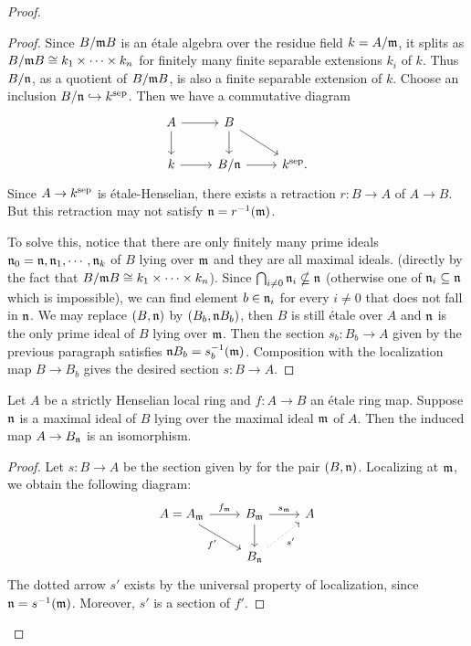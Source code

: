 \begin{proof}
\begin{proof}
  Since \(B/{\mathfrak{m}} B\) is an étale algebra over the residue field \(k = A/{\mathfrak{m}}\), it splits as \(B/{\mathfrak{m}} B \cong k_1 \times \cdots \times k_n\) for finitely many finite separable extensions \(k_i\) of \(k\). Thus \(B/{\mathfrak{n}}\), as a quotient of \(B/{\mathfrak{m}} B\), is also a finite separable extension of \(k\). Choose an inclusion \(B/{\mathfrak{n}} \hookrightarrow k^{\textnormal{sep}}\). Then we have a commutative diagram
  \[
  \begin{tikzcd}
    A \arrow{r} \arrow{d} & B \arrow{d}\arrow{rd} & \\
    k \arrow{r} & B/\n \arrow{r} & k^{\sep}.
  \end{tikzcd}
  \]
  Since \(A \to k^{\textnormal{sep}}\) is étale-Henselian, there exists a retraction \(r : B \to A\) of \(A \to B\). But this retraction may not satisfy \({\mathfrak{n}} = r^{-1}({\mathfrak{m}})\). 
  
  To solve this, notice that there are only finitely many prime ideals \({\mathfrak{n}}_0 = {\mathfrak{n}}, {\mathfrak{n}}_1, \cdots, {\mathfrak{n}}_k\) of \(B\) lying over \({\mathfrak{m}}\) and they are all maximal ideals. (directly by the fact that \(B/{\mathfrak{m}} B \cong k_1 \times \cdots \times k_n\)). Since \(\bigcap_{i \ne 0} {\mathfrak{n}}_i \nsubseteq {\mathfrak{n}}\) (otherwise one of \({\mathfrak{n}}_i \subseteq {\mathfrak{n}}\) which is impossible), we can find element \(b \in {\mathfrak{n}}_i\) for every \(i \ne 0\) that does not fall in ${\mathfrak{n}}$. We may replace \((B, {\mathfrak{n}})\) by \((B_b, {\mathfrak{n}} B_b)\), then \(B\) is still étale over \(A\) and \({\mathfrak{n}}\) is the only prime ideal of \(B\) lying over \({\mathfrak{m}}\). Then the section \(s_b : B_b \to A\) given by the previous paragraph satisfies \({\mathfrak{n}} B_b = s_b^{-1}({\mathfrak{m}})\). Composition with the localization map \(B \to B_b\) gives the desired section \(s : B \to A\).
\end{proof}

\begin{proposition}
    \label{thm:etale-over-strictly-henselian-localization-isom}
    Let \(A\) be a strictly Henselian local ring and \(f : A \to B\) an étale ring map. Suppose \({\mathfrak{n}}\) is a maximal ideal of \(B\) lying over the maximal ideal \({\mathfrak{m}}\) of \(A\). Then the induced map \(A \to B_{\mathfrak{n}}\) is an isomorphism.
\end{proposition}

\begin{proof}
  Let \(s: B \to A\) be the section given by  for the pair \((B, {\mathfrak{n}})\). Localizing at \({\mathfrak{m}}\), we obtain the following diagram:
  \[
  \begin{tikzcd}
    A = A_\m \arrow[r, "f_\m"]\arrow[dr, "f'"'] & B_\m \arrow[d] \arrow[r, "s_\m"] & A \\
    & B_\n \arrow[ur, dotted, "s'"'] &
  \end{tikzcd}
  \]
  The dotted arrow \(s'\) exists by the universal property of localization, since \({\mathfrak{n}} = s^{-1}({\mathfrak{m}})\). Moreover, \(s'\) is a section of \(f'\).


\end{proof}
\end{proof}
